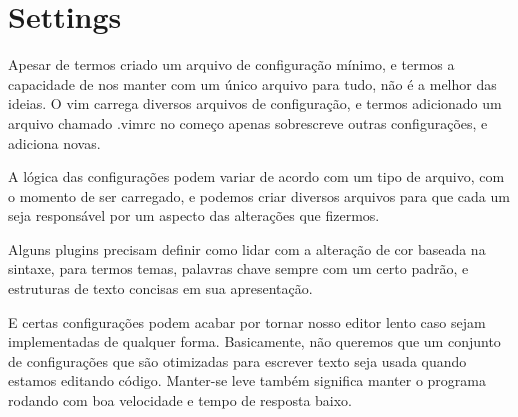 \chapter{Settings}
Apesar de termos criado um arquivo de configuração mínimo,
e termos a capacidade de nos manter com um único arquivo para tudo, não é a melhor das ideias.
O vim carrega diversos arquivos de configuração, e termos adicionado um arquivo chamado .vimrc no começo apenas
sobrescreve outras configurações, e adiciona novas.

A lógica das configurações podem variar de acordo com um tipo de arquivo,
com o momento de ser carregado, e podemos criar diversos arquivos para que cada
um seja responsável por um aspecto das alterações que fizermos.

Alguns plugins precisam definir como lidar com a alteração de cor baseada na sintaxe,
para termos temas, palavras chave sempre com um certo padrão, e estruturas de texto
concisas em sua apresentação.

E certas configurações podem acabar por tornar nosso editor lento caso sejam implementadas
de qualquer forma. Basicamente, não queremos que um conjunto de configurações que são otimizadas
para escrever texto seja usada quando estamos editando código.
Manter-se leve também significa manter o programa rodando com boa velocidade e tempo de resposta baixo.


